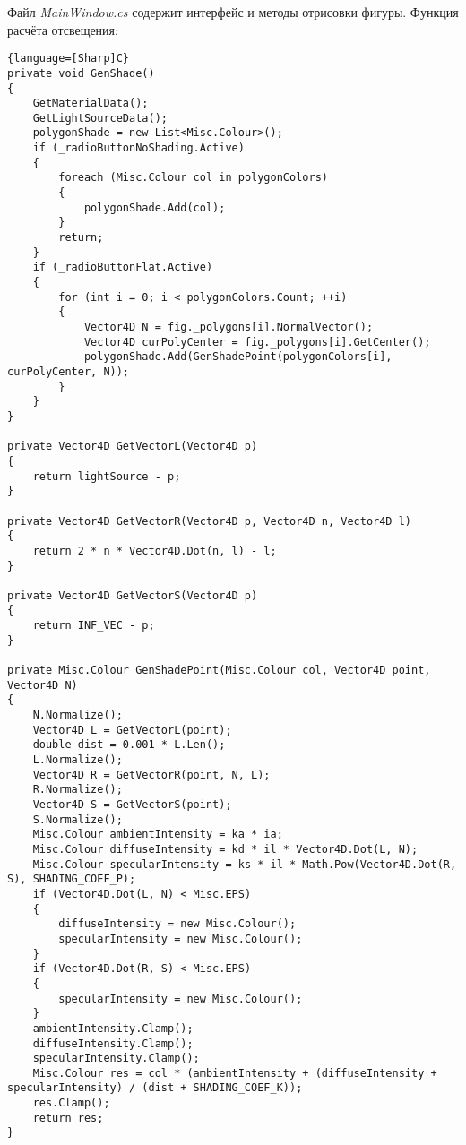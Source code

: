 Файл \textit{MainWindow.cs} содержит интерфейс и методы отрисовки фигуры. Функция расчёта отсвещения:
\begin{lstlisting}{language=[Sharp]C}
private void GenShade()
{
    GetMaterialData();
    GetLightSourceData();
    polygonShade = new List<Misc.Colour>();
    if (_radioButtonNoShading.Active)
    {
        foreach (Misc.Colour col in polygonColors)
        {
            polygonShade.Add(col);
        }
        return;
    }
    if (_radioButtonFlat.Active)
    {
        for (int i = 0; i < polygonColors.Count; ++i)
        {
            Vector4D N = fig._polygons[i].NormalVector();
            Vector4D curPolyCenter = fig._polygons[i].GetCenter();
            polygonShade.Add(GenShadePoint(polygonColors[i], curPolyCenter, N));
        }
    }
}

private Vector4D GetVectorL(Vector4D p)
{
    return lightSource - p;
}

private Vector4D GetVectorR(Vector4D p, Vector4D n, Vector4D l)
{
    return 2 * n * Vector4D.Dot(n, l) - l;
}

private Vector4D GetVectorS(Vector4D p)
{
    return INF_VEC - p;
}

private Misc.Colour GenShadePoint(Misc.Colour col, Vector4D point, Vector4D N)
{
    N.Normalize();
    Vector4D L = GetVectorL(point);
    double dist = 0.001 * L.Len();
    L.Normalize();
    Vector4D R = GetVectorR(point, N, L);
    R.Normalize();
    Vector4D S = GetVectorS(point);
    S.Normalize();
    Misc.Colour ambientIntensity = ka * ia;
    Misc.Colour diffuseIntensity = kd * il * Vector4D.Dot(L, N);
    Misc.Colour specularIntensity = ks * il * Math.Pow(Vector4D.Dot(R, S), SHADING_COEF_P);
    if (Vector4D.Dot(L, N) < Misc.EPS)
    {
        diffuseIntensity = new Misc.Colour();
        specularIntensity = new Misc.Colour();
    }
    if (Vector4D.Dot(R, S) < Misc.EPS)
    {
        specularIntensity = new Misc.Colour();
    }
    ambientIntensity.Clamp();
    diffuseIntensity.Clamp();
    specularIntensity.Clamp();
    Misc.Colour res = col * (ambientIntensity + (diffuseIntensity + specularIntensity) / (dist + SHADING_COEF_K));
    res.Clamp();
    return res;
}
\end{lstlisting}
\pagebreak
